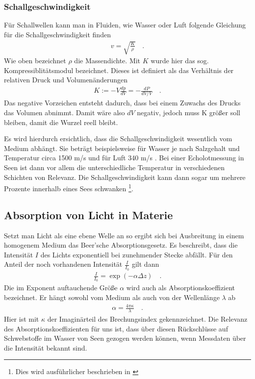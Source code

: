 \documentclass[12pt,a4paper,titlepage,headinclude,bibtotoc]{scrartcl}
\numberwithin{equation}{subsection}
\begin{document}
\subsubsection{Schallgeschwindigkeit}
\label{sec:theschallgeschw}
Für Schallwellen kann man in Fluiden, wie Wasser oder Luft folgende Gleichung für die Schallgeschwindigkeit finden
\begin{align}
 v = \sqrt{  \frac{K}{\rho}  }\quad.
\end{align}
Wie oben bezeichnet $\rho$ die Massendichte. Mit $K$ wurde hier das sog. Kompressiblitätsmodul bezeichnet. Dieses ist definiert als das Verhältnis der relativen Druck und Volumenänderungen
\begin{align}
 K := - V \frac{d p}{d V}  = - \frac{d P}{d V / V }\quad.
\end{align}
Das negative Vorzeichen entsteht dadurch, dass bei einem Zuwachs des Drucks das Volumen abnimmt. Damit wäre also $dV$ negativ, jedoch muss K größer soll bleiben, damit die Wurzel reell bleibt.


Es wird hierdurch ersichtlich, dass die Schallgeschwindigkeit wesentlich vom Medium abhängt. 
Sie beträgt beispielsweise für Wasser je nach Salzgehalt und Temperatur circa 1500 m/s  und für Luft 340 m/s  \cite{tipler}.
Bei einer Echolotmessung in Seen ist dann vor allem die unterschiedliche Temperatur in verschiedenen Schichten 
von Relevanz. Die Schallgeschwindigkeit kann dann sogar um mehrere Prozente innerhalb eines Sees schwanken  
\footnote{Dies wird ausführlicher beschrieben in \cite{schicht}}.



\subsection{Absorption von Licht in Materie}
Setzt man Licht als eine ebene Welle an so ergibt sich bei Ausbreitung in einem homogenem Medium das Beer'sche Absorptionsgesetz.
Es beschreibt, dass die Intensität $I$ des Lichts exponentiell bei zunehmender Stecke abfällt.
Für den Anteil der noch vorhandenen Intensität $\frac{I}{I_0}$ gilt dann
\begin{align}
 \frac{I}{I_0}  =  \exp(- \alpha  \Delta z)\quad.
\end{align}
Die im Exponent auftauchende Größe $\alpha$ wird auch als Absorptionskoeffizient bezeichnet. Er hängt sowohl vom Medium als auch von der Wellenlänge $\lambda$ ab
\begin{align}
 \alpha= \frac{4 \pi \kappa}{\lambda}\quad.
\end{align}
Hier ist mit $\kappa$ der Imaginärteil des Brechungsindex gekennzeichnet.
Die Relevanz des Absorptionskoeffizienten für uns ist, dass über diesen Rückschlüsse auf Schwebstoffe im Wasser von Seen gezogen werden können, wenn Messdaten über die Intensität bekannt sind.
\cite[S.229]{meschede}
\end{document}
